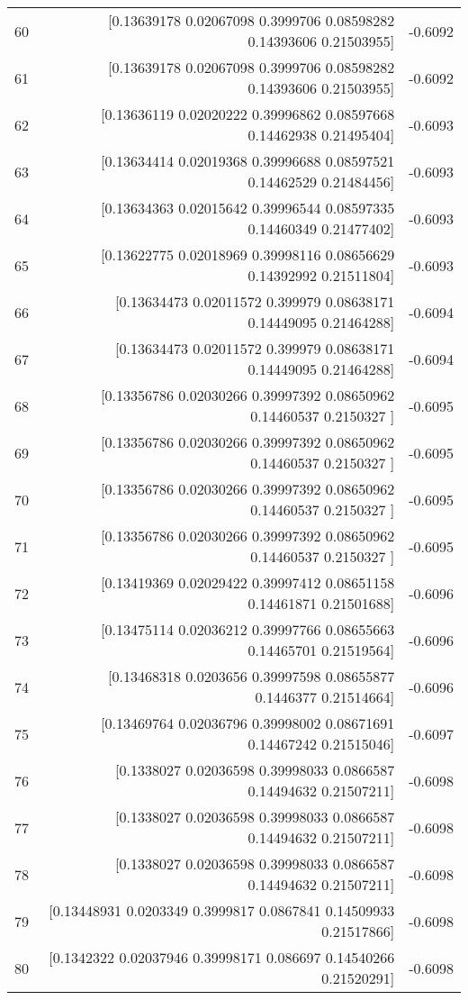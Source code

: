 \begin{longtable}{lrr}
60 & [0.13639178 0.02067098 0.3999706  0.08598282 0.14393606 0.21503955] & -0.6092 \\
61 & [0.13639178 0.02067098 0.3999706  0.08598282 0.14393606 0.21503955] & -0.6092 \\
62 & [0.13636119 0.02020222 0.39996862 0.08597668 0.14462938 0.21495404] & -0.6093 \\
63 & [0.13634414 0.02019368 0.39996688 0.08597521 0.14462529 0.21484456] & -0.6093 \\
64 & [0.13634363 0.02015642 0.39996544 0.08597335 0.14460349 0.21477402] & -0.6093 \\
65 & [0.13622775 0.02018969 0.39998116 0.08656629 0.14392992 0.21511804] & -0.6093 \\
66 & [0.13634473 0.02011572 0.399979   0.08638171 0.14449095 0.21464288] & -0.6094 \\
67 & [0.13634473 0.02011572 0.399979   0.08638171 0.14449095 0.21464288] & -0.6094 \\
68 & [0.13356786 0.02030266 0.39997392 0.08650962 0.14460537 0.2150327 ] & -0.6095 \\
69 & [0.13356786 0.02030266 0.39997392 0.08650962 0.14460537 0.2150327 ] & -0.6095 \\
70 & [0.13356786 0.02030266 0.39997392 0.08650962 0.14460537 0.2150327 ] & -0.6095 \\
71 & [0.13356786 0.02030266 0.39997392 0.08650962 0.14460537 0.2150327 ] & -0.6095 \\
72 & [0.13419369 0.02029422 0.39997412 0.08651158 0.14461871 0.21501688] & -0.6096 \\
73 & [0.13475114 0.02036212 0.39997766 0.08655663 0.14465701 0.21519564] & -0.6096 \\
74 & [0.13468318 0.0203656  0.39997598 0.08655877 0.1446377  0.21514664] & -0.6096 \\
75 & [0.13469764 0.02036796 0.39998002 0.08671691 0.14467242 0.21515046] & -0.6097 \\
76 & [0.1338027  0.02036598 0.39998033 0.0866587  0.14494632 0.21507211] & -0.6098 \\
77 & [0.1338027  0.02036598 0.39998033 0.0866587  0.14494632 0.21507211] & -0.6098 \\
78 & [0.1338027  0.02036598 0.39998033 0.0866587  0.14494632 0.21507211] & -0.6098 \\
79 & [0.13448931 0.0203349  0.3999817  0.0867841  0.14509933 0.21517866] & -0.6098 \\
80 & [0.1342322  0.02037946 0.39998171 0.086697   0.14540266 0.21520291] & -0.6098 \\

\end{longtable}
